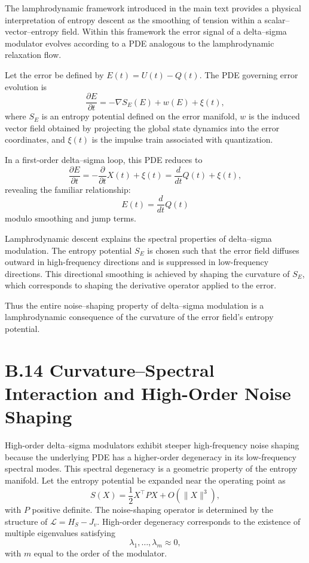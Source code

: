 The lamphrodynamic framework introduced in the main text provides a physical interpretation of entropy descent as the smoothing of tension within a scalar–vector–entropy field. Within this framework the error signal of a delta–sigma modulator evolves according to a PDE analogous to the lamphrodynamic relaxation flow.

Let the error be defined by \(E(t) = U(t) - Q(t)\). The PDE governing error evolution is
\[
\frac{\partial E}{\partial t}
= -\nabla S_{E}(E) + w(E) + \xi(t),
\]
where \(S_{E}\) is an entropy potential defined on the error manifold, \(w\) is the induced vector field obtained by projecting the global state dynamics into the error coordinates, and \(\xi(t)\) is the impulse train associated with quantization.

In a first-order delta–sigma loop, this PDE reduces to
\[
\frac{\partial E}{\partial t}
= -\frac{\partial}{\partial t} X(t) + \xi(t)
= \frac{d}{dt}Q(t) + \xi(t),
\]
revealing the familiar relationship:
\[
E(t) = \frac{d}{dt}Q(t)
\]
modulo smoothing and jump terms.

Lamphrodynamic descent explains the spectral properties of delta–sigma modulation. The entropy potential \(S_{E}\) is chosen such that the error field diffuses outward in high-frequency directions and is suppressed in low-frequency directions. This directional smoothing is achieved by shaping the curvature of \(S_{E}\), which corresponds to shaping the derivative operator applied to the error.

Thus the entire noise–shaping property of delta–sigma modulation is a lamphrodynamic consequence of the curvature of the error field’s entropy potential.

\section{B.14 Curvature–Spectral Interaction and High-Order Noise Shaping}

High-order delta–sigma modulators exhibit steeper high-frequency noise shaping because the underlying PDE has a higher-order degeneracy in its low-frequency spectral modes. This spectral degeneracy is a geometric property of the entropy manifold. Let the entropy potential be expanded near the operating point as
\[
S(X) = \frac{1}{2} X^{\top} P X + O(\|X\|^{3}),
\]
with \(P\) positive definite. The noise-shaping operator is determined by the structure of \(\mathcal{L} = H_{S} - J_{v}\). High-order degeneracy corresponds to the existence of multiple eigenvalues satisfying
\[
\lambda_{1}, \ldots, \lambda_{m} \approx 0,
\]
with \(m\) equal to the order of the modulator.

